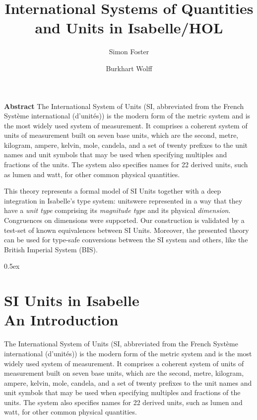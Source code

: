 \documentclass[11pt,a4paper]{book}
\begin{document}
\title{International Systems of Quantities and Units in Isabelle/HOL}
\author{Simon Foster \and Burkhart Wolff}
\maketitle

\textbf{ Abstract } 
The International System of Units 
(SI, abbreviated from the French Syst\`eme international (d’unit\'es)) is the modern form of 
the metric system and is the most widely used system of measurement. It comprises a coherent 
system of units of measurement built on seven base units, which are the second, metre, kilogram, 
ampere, kelvin, mole, candela, and a set of twenty prefixes to the unit names and unit symbols 
that may be used when specifying multiples and fractions of the units. The system also specifies 
names for 22 derived units, such as lumen and watt, for other common physical quantities. 

This theory represents a formal model of SI Units together with a deep integration in Isabelle's
type system: unitswere represented in a way that they have a \emph{unit type} comprising its 
\emph{magnitude type} and its physical \emph{dimension}. Congruences on dimensions were supported. 
Our construction is validated by a test-set of known equivalences between SI Units.
Moreover, the presented theory can be used for type-safe conversions between the SI system and
others, like the British Imperial System (BIS).

\tableofcontents

\parindent 0pt\parskip 0.5ex


\chapter{SI Units in Isabelle \\ An Introduction}

The International System of Units (SI, abbreviated from the French
Système international (d'unités)) is the modern form of the metric
system and is the most widely used system of measurement. It comprises
a coherent system of units of measurement built on seven base units,
which are the second, metre, kilogram, ampere, kelvin, mole, candela,
and a set of twenty prefixes to the unit names and unit symbols that
may be used when specifying multiples and fractions of the units.
The system also specifies names for 22 derived units, such as lumen and
watt, for other common physical quantities.
\end{document}
